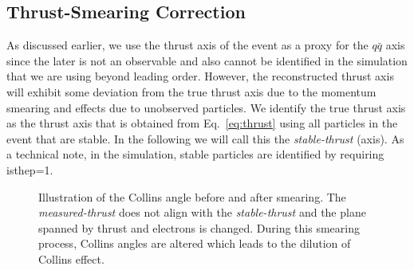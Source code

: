 


\subsection{\texorpdfstring{Thrust-Smearing Correction}{Thrust smearing correction}}
\label{sec:smearingcorrection}

As discussed earlier, we use the thrust axis of the event as a proxy for the $q\bar{q}$ axis since the later is not an observable and  also cannot be identified in the simulation that we are using beyond leading order.
However, the reconstructed thrust axis will exhibit some deviation from the true thrust axis due to the momentum smearing and effects due to unobserved particles. We identify the true thrust axis as the thrust axis that is obtained from Eq.~\ref{eq:thrust} using all particles in the event that are stable. In the following we will call this the  {\em stable-thrust} (axis). As a technical note, in the simulation, stable particles are identified by requiring isthep=1.

\begin{figure}[h]
\tiny
  \centering     
  \caption[Illustration of the Collins angle before and after smearing]{Illustration of the Collins angle before and after smearing. The {\em measured-thrust} does not align with the {\em stable-thrust} and the plane spanned by thrust and electrons is changed. During this smearing process, Collins angles are altered which leads to the dilution of Collins effect.}
  \label{fig:SmearIllustr}
\end{figure}

